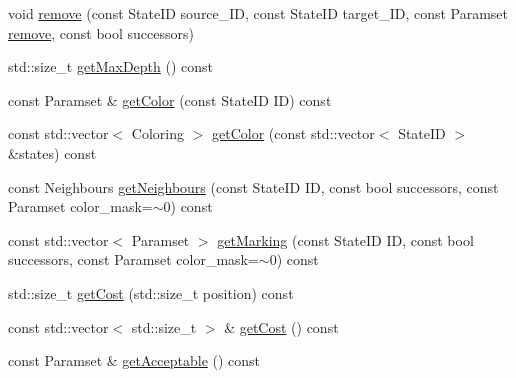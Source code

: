 \begin{DoxyCompactItemize}
\item 
void \hyperlink{classColorStorage_af721239710649771ecb27d0713f9d6d1}{remove} (const \-State\-I\-D source\-\_\-\-I\-D, const \-State\-I\-D target\-\_\-\-I\-D, const \-Paramset \hyperlink{classColorStorage_aabf4f8151046e9ec96996f09733ac62e}{remove}, const bool successors)
\item 
std\-::size\-\_\-t \hyperlink{classColorStorage_afe60ca128d4151deedfcb5ba623c328d}{get\-Max\-Depth} () const 
\item 
const \-Paramset \& \hyperlink{classColorStorage_a591beaa3906026ebe5313a9b2f3a1f57}{get\-Color} (const \-State\-I\-D \-I\-D) const 
\item 
const std\-::vector$<$ \-Coloring $>$ \hyperlink{classColorStorage_aca489cd7f6bff18444ffd84ab82b3d17}{get\-Color} (const std\-::vector$<$ \-State\-I\-D $>$ \&states) const 
\item 
const \-Neighbours \hyperlink{classColorStorage_adf86df0971b697e53951f61b8098db1b}{get\-Neighbours} (const \-State\-I\-D \-I\-D, const bool successors, const \-Paramset color\-\_\-mask=$\sim$0) const 
\item 
const std\-::vector$<$ \-Paramset $>$ \hyperlink{classColorStorage_a2d3ff1e015edc1477d908943ef832322}{get\-Marking} (const \-State\-I\-D \-I\-D, const bool successors, const \-Paramset color\-\_\-mask=$\sim$0) const 
\item 
std\-::size\-\_\-t \hyperlink{classColorStorage_a0c605e23a407dfe5e7f89a5347bef859}{get\-Cost} (std\-::size\-\_\-t position) const 
\item 
const std\-::vector$<$ std\-::size\-\_\-t $>$ \& \hyperlink{classColorStorage_a10ba68916d345d514b3b6f9af282c3a9}{get\-Cost} () const 
\item 
const \-Paramset \& \hyperlink{classColorStorage_a97502ca9be7ca5a5a5c222423356c508}{get\-Acceptable} () const 
\end{DoxyCompactItemize}


